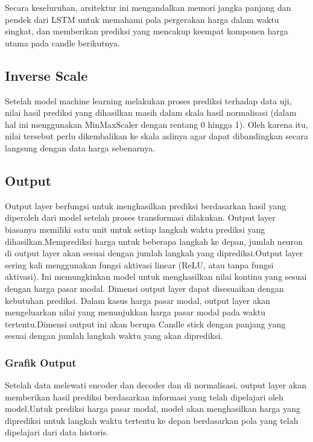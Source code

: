 Secara keseluruhan, arsitektur ini mengandalkan memori jangka panjang dan pendek dari LSTM untuk memahami pola pergerakan harga dalam waktu singkat, dan memberikan prediksi yang mencakup keempat komponen harga utama pada candle berikutnya.


\subsection{Inverse Scale}
Setelah model machine learning melakukan proses prediksi terhadap data uji, nilai hasil prediksi yang dihasilkan masih dalam skala hasil normalisasi (dalam hal ini menggunakan MinMaxScaler dengan rentang 0 hingga 1). Oleh karena itu, nilai tersebut perlu dikembalikan ke skala aslinya agar dapat dibandingkan secara langsung dengan data harga sebenarnya.


\subsection{Output}
Output layer berfungsi untuk menghasilkan prediksi berdasarkan hasil yang diperoleh dari model setelah proses transformasi dilakukan. Output layer biasanya memiliki satu unit untuk setiap langkah waktu prediksi yang dihasilkan.Memprediksi harga untuk beberapa langkah ke depan, jumlah neuron di output layer akan sesuai dengan jumlah langkah yang diprediksi.Output layer sering kali menggunakan fungsi aktivasi linear (ReLU, atau tanpa fungsi aktivasi). Ini memungkinkan model untuk menghasilkan nilai kontinu yang sesuai dengan harga pasar modal. Dimensi output layer dapat disesuaikan dengan kebutuhan prediksi. Dalam kasus harga pasar modal, output layer akan mengeluarkan nilai yang menunjukkan harga pasar modal pada waktu tertentu.Dimensi output ini akan berupa Candle stick dengan panjang yang sesuai dengan jumlah langkah waktu yang akan diprediksi.
\subsubsection{Grafik Output}
Setelah data melewati encoder dan decoder dan di normalisasi, output layer akan memberikan hasil prediksi berdasarkan informasi yang telah dipelajari oleh model.Untuk prediksi harga pasar modal, model akan menghasilkan harga yang diprediksi untuk langkah waktu tertentu ke depan berdasarkan pola yang telah dipelajari dari data historis.

